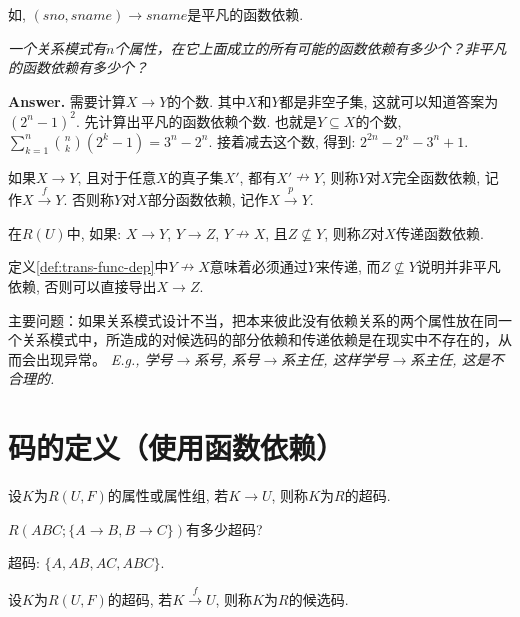 如, $(sno,sname)\to sname$是平凡的函数依赖.

\textit{一个关系模式有$n$个属性，在它上面成立的所有可能的函数依赖有多少个？非平凡的函数依赖有多少个？}

\textbf{Answer.} 需要计算$X\to Y$的个数. 其中$X$和$Y$都是非空子集, 这就可以知道答案为$(2^n-1)^2$.  先计算出平凡的函数依赖个数. 也就是$Y\subseteq X$的个数, $\sum_{k=1}^{n} \binom{n}{k} (2^k-1)=3^n-2^n$. 接着减去这个数, 得到: $2^{2n}-2^n-3^n+1$.


\begin{definition}[完全函数依赖] \label{def:tot-func-dep}
  如果$X\to Y$, 且对于任意$X$的真子集$X'$, 都有$X' \nrightarrow Y$, 则称$Y$对$X$完全函数依赖, 记作$X\overset{f}{\rightarrow} Y$. 否则称$Y$对$X$部分函数依赖, 记作$X\overset{p}{\rightarrow}Y$.
\end{definition}

\begin{definition}[传递函数依赖] \label{def:trans-func-dep}
  在$R(U)$中, 如果: $X\to Y$, $Y\to Z$, $Y\nrightarrow X$, 且$Z\nsubseteq Y$, 则称$Z$对$X$传递函数依赖.
\end{definition}

\begin{remark}
  定义\ref{def:trans-func-dep}中$Y\nrightarrow X$意味着必须通过$Y$来传递, 而$Z\nsubseteq Y$说明并非平凡依赖, 否则可以直接导出$X\to Z$.
\end{remark}

主要问题：如果关系模式设计不当，把本来彼此没有依赖关系的两个属性放在同一个关系模式中，所造成的对候选码的部分依赖和传递依赖是在现实中不存在的，从而会出现异常。
\textit{E.g., 学号$\to$系号, 系号$\to$系主任, 这样学号$\to$系主任, 这是不合理的.}

\section{码的定义（使用函数依赖）}

\begin{definition}[超码]
  设$K$为$R(U,F)$的属性或属性组, 若$K\to U$, 则称$K$为$R$的超码.
\end{definition}

\begin{example}
  $R(ABC;\{A\to B,B\to C\})$有多少超码?

  超码: $\{A,AB,AC,ABC\}$.
\end{example}

\begin{definition}[候选码]
  设$K$为$R(U,F)$的超码, 若$K\overset{f}{\rightarrow} U$, 则称$K$为$R$的候选码.
\end{definition}

